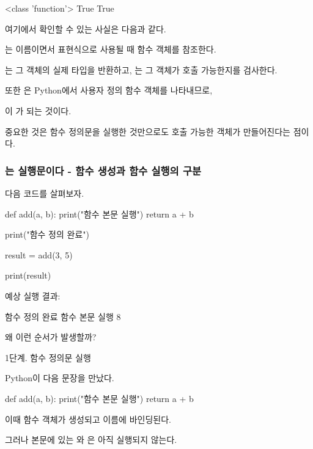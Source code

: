 \begin{dhkzsh}
<class 'function'>
True
True
\end{dhkzsh}

여기에서 확인할 수 있는 사실은 다음과 같다.

는 이름이면서 표현식으로 사용될 때 함수 객체를 참조한다.

는 그 객체의 실제 타입을 반환하고, 는 그 객체가 호출 가능한지를 검사한다.

또한 은 Python에서 사용자 정의 함수 객체를 나타내므로,

이 가 되는 것이다.

중요한 것은 함수 정의문을 실행한 것만으로도 호출 가능한 객체가 만들어진다는 점이다.

\subsubsection{는 실행문이다 - 함수 생성과 함수 실행의 구분}

다음 코드를 살펴보자.

\begin{dhkcode}
def add(a, b):
    print("함수 본문 실행")
    return a + b


print("함수 정의 완료")

result = add(3, 5)

print(result)
\end{dhkcode}

예상 실행 결과:

\begin{dhkzsh}
함수 정의 완료
함수 본문 실행
8
\end{dhkzsh}

왜 이런 순서가 발생할까?

\begin{dhknote}
\begin{dhksmry}[centered]
1단계. 함수 정의문 실행
\end{dhksmry}
\end{dhknote}

Python이 다음 문장을 만났다.

\begin{dhkcode}
def add(a, b):
    print("함수 본문 실행")
    return a + b
\end{dhkcode}

이때 함수 객체가 생성되고  이름에 바인딩된다.

그러나 본문에 있는 와 은 아직 실행되지 않는다.

